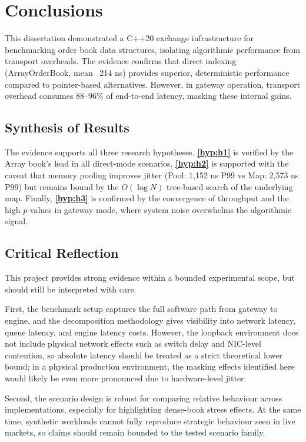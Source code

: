 \chapter{Conclusions}
\label{chap:conclusions}

This dissertation demonstrated a C++20 exchange infrastructure for benchmarking 
order book data structures, isolating algorithmic performance from transport 
overheads. The evidence confirms that direct indexing (ArrayOrderBook, mean 
~214 ns) provides superior, deterministic performance compared to pointer-based 
alternatives. However, in gateway operation, transport overhead consumes 
88--96\% of end-to-end latency, masking these internal gains.

\section{Synthesis of Results}
The evidence supports all three research hypotheses. \textbf{\ref{hyp:h1}} is verified by 
the Array book's lead in all direct-mode scenarios. \textbf{\ref{hyp:h2}} is supported 
with the caveat that memory pooling improves jitter (Pool: 1,152 ns P99 vs Map: 2,573 ns P99) 
but remains bound by the $O(\log N)$ tree-based search of the underlying map. 
Finally, \textbf{\ref{hyp:h3}} is confirmed by the convergence of 
throughput and the high $p$-values in gateway mode, where system noise overwhelms the 
algorithmic signal.

\section{Critical Reflection}
This project provides strong evidence within a bounded experimental
scope, but should still be interpreted with care.

First, the benchmark setup captures the full software path from gateway to
engine, and the decomposition methodology gives visibility into
network latency, queue latency, and engine latency costs. However, the loopback environment does not include physical
network effects such as switch delay and NIC-level contention, so absolute
latency should be treated as a strict theoretical lower bound; in a physical 
production environment, the masking effects identified here would likely be even 
more pronounced due to hardware-level jitter.

Second, the scenario design is robust for comparing relative behaviour across
implementations, especially for highlighting dense-book stress effects. At the
same time, synthetic workloads cannot fully reproduce strategic behaviour seen
in live markets, so claims should remain bounded to the tested scenario family.


